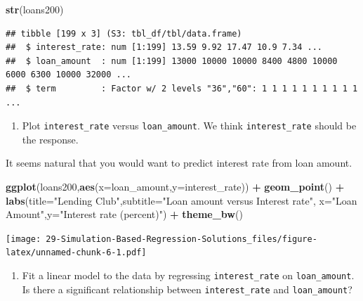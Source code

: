 \documentclass[
]{book}
\newenvironment{Shaded}{\begin{snugshade}}{\end{snugshade}}
\newcommand{\DataTypeTok}[1]{\textcolor[rgb]{0.13,0.29,0.53}{#1}}
\newcommand{\KeywordTok}[1]{\textcolor[rgb]{0.13,0.29,0.53}{\textbf{#1}}}
\newcommand{\NormalTok}[1]{#1}
\newcommand{\OperatorTok}[1]{\textcolor[rgb]{0.81,0.36,0.00}{\textbf{#1}}}
\newcommand{\StringTok}[1]{\textcolor[rgb]{0.31,0.60,0.02}{#1}}
\providecommand{\tightlist}{%
  \setlength{\itemsep}{0pt}\setlength{\parskip}{0pt}}
\begin{document}
\begin{Shaded}
\begin{Highlighting}[]
\KeywordTok{str}\NormalTok{(loans200)}
\end{Highlighting}
\end{Shaded}

\begin{verbatim}
## tibble [199 x 3] (S3: tbl_df/tbl/data.frame)
##  $ interest_rate: num [1:199] 13.59 9.92 17.47 10.9 7.34 ...
##  $ loan_amount  : num [1:199] 13000 10000 10000 8400 4800 10000 6000 6300 10000 32000 ...
##  $ term         : Factor w/ 2 levels "36","60": 1 1 1 1 1 1 1 1 1 1 ...
\end{verbatim}

\begin{enumerate}
\def\labelenumi{\alph{enumi}.}
\setcounter{enumi}{2}
\tightlist
\item
  Plot \texttt{interest\_rate} versus \texttt{loan\_amount}. We think \texttt{interest\_rate} should be the response.
\end{enumerate}

It seems natural that you would want to predict interest rate from loan amount.

\begin{Shaded}
\begin{Highlighting}[]
\KeywordTok{ggplot}\NormalTok{(loans200,}\KeywordTok{aes}\NormalTok{(}\DataTypeTok{x=}\NormalTok{loan_amount,}\DataTypeTok{y=}\NormalTok{interest_rate)) }\OperatorTok{+}
\StringTok{  }\KeywordTok{geom_point}\NormalTok{() }\OperatorTok{+}
\StringTok{  }\KeywordTok{labs}\NormalTok{(}\DataTypeTok{title=}\StringTok{"Lending Club"}\NormalTok{,}\DataTypeTok{subtitle=}\StringTok{"Loan amount versus Interest rate"}\NormalTok{,}
       \DataTypeTok{x=}\StringTok{"Loan Amount"}\NormalTok{,}\DataTypeTok{y=}\StringTok{"Interest rate (percent)"}\NormalTok{) }\OperatorTok{+}
\StringTok{  }\KeywordTok{theme_bw}\NormalTok{()}
\end{Highlighting}
\end{Shaded}

\texttt{[image: 29-Simulation-Based-Regression-Solutions\_files/figure-latex/unnamed-chunk-6-1.pdf]}

\begin{enumerate}
\def\labelenumi{\alph{enumi}.}
\setcounter{enumi}{3}
\tightlist
\item
  Fit a linear model to the data by regressing \texttt{interest\_rate} on \texttt{loan\_amount}. Is there a significant relationship between \texttt{interest\_rate} and \texttt{loan\_amount}?
\end{enumerate}
\end{document}
